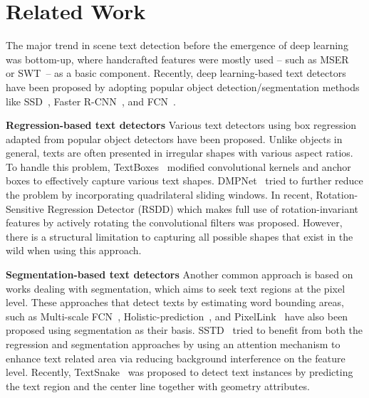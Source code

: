 \documentclass[10pt,twocolumn,letterpaper]{article}
\begin{document}
 \section{Related Work}

The major trend in scene text detection before the emergence of deep learning was bottom-up, where handcrafted features were mostly used -- such as MSER~\cite{matas2004robust} or SWT~\cite{epshtein2010detecting}-- as a basic component. Recently, deep learning-based text detectors have been proposed by adopting popular object detection/segmentation methods like SSD~\cite{liu2016ssd}, Faster R-CNN~\cite{ren2017faster}, and FCN~\cite{long2015fully}. 

\vspace{2mm}
{\bf Regression-based text detectors }
Various text detectors using box regression adapted from popular object detectors have been proposed. Unlike objects in general, texts are often presented in irregular shapes with various aspect ratios. To handle this problem, TextBoxes~\cite{liao2017textboxes} modified convolutional kernels and anchor boxes to effectively capture various text shapes. DMPNet~\cite{liu2017deep} tried to further reduce the problem by incorporating quadrilateral sliding windows. In recent, Rotation-Sensitive Regression Detector (RSDD) \cite{liao2018rotation} which makes full use of rotation-invariant features by actively rotating the convolutional filters was proposed. However, there is a structural limitation to capturing all possible shapes that exist in the wild when using this approach.

\vspace{2mm}
{\bf Segmentation-based text detectors } 
Another common approach is based on works dealing with segmentation, which aims to seek text regions at the pixel level. These approaches that detect texts by estimating word bounding areas, such as Multi-scale FCN~\cite{he2017multi}, Holistic-prediction~\cite{yao2016scene}, and PixelLink~\cite{deng2018pixellink} have also been proposed using segmentation as their basis. 
SSTD~\cite{he2017single} tried to benefit from both the regression and segmentation approaches by using an attention mechanism to enhance text related area via reducing background interference on the feature level. Recently, TextSnake~\cite{long2018textsnake} was proposed to detect text instances by predicting the text region and the center line together with geometry attributes.
\end{document}
